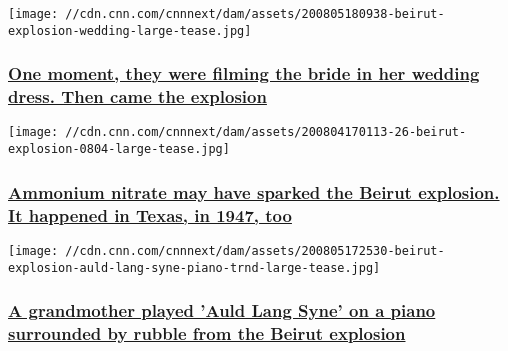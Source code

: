 \href{/2020/08/05/middleeast/beirut-explosion-couple-wedding-shoot-trnd/index.html}{}

\texttt{[image: //cdn.cnn.com/cnnnext/dam/assets/200805180938-beirut-explosion-wedding-large-tease.jpg]}

\hypertarget{one-moment-they-were-filming-the-bride-in-her-wedding-dress-then-came-the-explosion}{%
\subsubsection{\texorpdfstring{\href{/2020/08/05/middleeast/beirut-explosion-couple-wedding-shoot-trnd/index.html}{One
moment, they were filming the bride in her wedding dress. Then came the
explosion}}{One moment, they were filming the bride in her wedding dress. Then came the explosion}}\label{one-moment-they-were-filming-the-bride-in-her-wedding-dress-then-came-the-explosion}}

\href{/2020/08/05/middleeast/ammonium-nitrate-beirut-blast-intl/index.html}{}

\texttt{[image: //cdn.cnn.com/cnnnext/dam/assets/200804170113-26-beirut-explosion-0804-large-tease.jpg]}

\hypertarget{ammonium-nitrate-may-have-sparked-the-beirut-explosion-it-happened-in-texas-in-1947-too}{%
\subsubsection{\texorpdfstring{\href{/2020/08/05/middleeast/ammonium-nitrate-beirut-blast-intl/index.html}{Ammonium
nitrate may have sparked the Beirut explosion. It happened in Texas, in
1947,
too}}{Ammonium nitrate may have sparked the Beirut explosion. It happened in Texas, in 1947, too}}\label{ammonium-nitrate-may-have-sparked-the-beirut-explosion-it-happened-in-texas-in-1947-too}}

\href{/2020/08/05/middleeast/beirut-explosion-auld-lang-syne-piano-trnd/index.html}{}

\texttt{[image: //cdn.cnn.com/cnnnext/dam/assets/200805172530-beirut-explosion-auld-lang-syne-piano-trnd-large-tease.jpg]}

\hypertarget{a-grandmother-played-auld-lang-syne-on-a-piano-surrounded-by-rubble-from-the-beirut-explosion-}{%
\subsubsection{\texorpdfstring{\href{/2020/08/05/middleeast/beirut-explosion-auld-lang-syne-piano-trnd/index.html}{A
grandmother played 'Auld Lang Syne' on a piano surrounded by rubble from
the Beirut explosion
}}{A grandmother played 'Auld Lang Syne' on a piano surrounded by rubble from the Beirut explosion }}\label{a-grandmother-played-auld-lang-syne-on-a-piano-surrounded-by-rubble-from-the-beirut-explosion-}}

